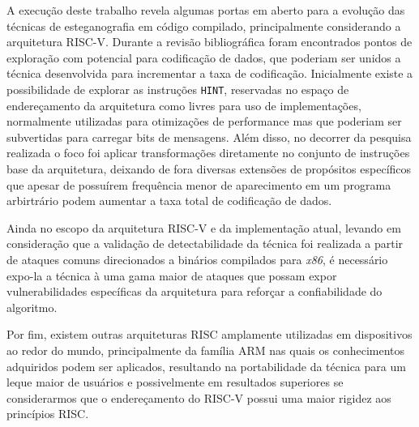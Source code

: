 A execução deste trabalho revela algumas portas em aberto para a evolução das técnicas de esteganografia em código compilado, principalmente considerando a arquitetura RISC-V. Durante a revisão bibliográfica foram encontrados pontos de exploração com potencial para codificação de dados, que poderiam ser unidos a técnica desenvolvida para incrementar a taxa de codificação. Inicialmente existe a possibilidade de explorar as instruções \texttt{HINT}, reservadas no espaço de endereçamento da arquitetura como livres para uso de implementações, normalmente utilizadas para otimizações de performance mas que poderiam ser subvertidas para carregar bits de mensagens. Além disso, no decorrer da pesquisa realizada o foco foi aplicar transformações diretamente no conjunto de instruções base da arquitetura, deixando de fora diversas extensões de propósitos específicos que apesar de possuírem frequência menor de aparecimento em um programa arbirtrário podem aumentar a taxa total de codificação de dados.

Ainda no escopo da arquitetura RISC-V e da implementação atual, levando em consideração que a validação de detectabilidade da técnica foi realizada a partir de ataques comuns direcionados a binários compilados para \textit{x86}, é necessário expo-la a técnica à uma gama maior de ataques que possam expor vulnerabilidades específicas da arquitetura para reforçar a confiabilidade do algoritmo.

Por fim, existem outras arquiteturas RISC amplamente utilizadas em dispositivos ao redor do mundo, principalmente da família ARM nas quais os conhecimentos adquiridos podem ser aplicados, resultando na portabilidade da técnica para um leque maior de usuários e possivelmente em resultados superiores se considerarmos que o endereçamento do RISC-V possui uma maior rigidez aos princípios RISC.